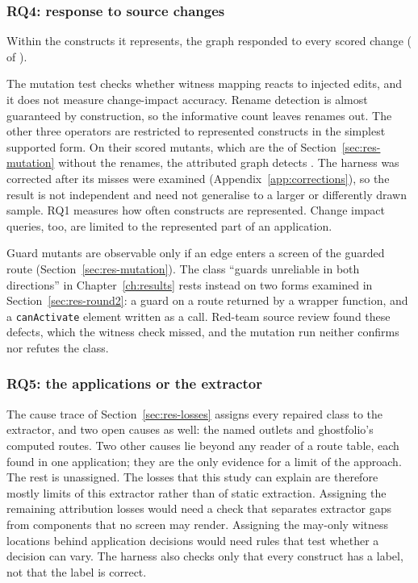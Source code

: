 \subsubsection{RQ4: response to source changes}
\label{sec:rq4}

Within the constructs it represents, the graph responded to every scored change
(\MutDetected{} of \MutScored{}).

The mutation test checks whether witness mapping reacts to injected edits, and it does not measure
change-impact accuracy. Rename detection is almost guaranteed by construction, so the informative
count leaves renames out. The other three operators are restricted to represented constructs in
the simplest supported form. On their \MutFallibleScored{} scored mutants, which are the
\MutScored{} of Section~\ref{sec:res-mutation} without the renames, the attributed graph detects
\MutFallibleDetected{}. The harness was corrected after its misses were examined
(Appendix~\ref{app:corrections}), so the result is not independent and need not generalise to a larger
or differently drawn sample. RQ1 measures how often constructs are represented. Change impact queries, too, are limited to the represented part of an application.

Guard mutants are observable only if an edge enters a screen of the guarded route
(Section~\ref{sec:res-mutation}). The class ``guards unreliable in both directions'' in
Chapter~\ref{ch:results} rests instead on two forms examined in Section~\ref{sec:res-round2}: a
guard on a route returned by a wrapper function, and a \texttt{canActivate} element written as a
call. Red-team source review found these defects, which the witness check missed, and the mutation
run neither confirms nor refutes the class.

\subsubsection{RQ5: the applications or the extractor}
\label{sec:rq5}

The cause trace of Section~\ref{sec:res-losses} assigns every repaired class to the extractor, and two
open causes as well: the named outlets and ghostfolio's computed routes. Two other causes lie beyond
any reader of a route table, each found in one application; they are the only evidence for a limit
of the approach. The rest is unassigned. The losses that this study can explain are therefore
mostly limits of this extractor rather than of static extraction. Assigning the remaining attribution losses would need a check that separates extractor gaps from
components that no screen may render. Assigning the may-only witness locations behind application decisions
would need rules that test whether a decision can vary. The harness also checks only that every
construct has a label, not that the label is correct.

